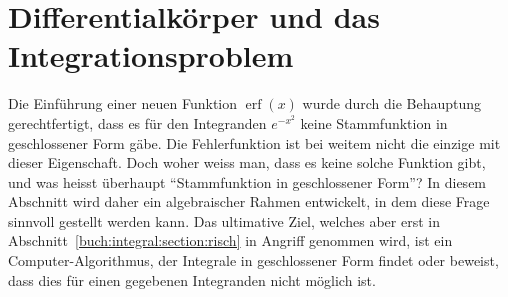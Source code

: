 %
%
%
\section{Differentialkörper und das Integrationsproblem
\label{buch:integrale:section:dkoerper}}
Die Einführung einer neuen Funktion $\operatorname{erf}(x)$ wurde
durch die Behauptung gerechtfertigt, dass es für den Integranden
$e^{-x^2}$ keine Stammfunktion in geschlossener Form gäbe.
Die Fehlerfunktion ist bei weitem nicht die einzige mit dieser
Eigenschaft.
Doch woher weiss man, dass es keine solche Funktion gibt, und
was heisst überhaupt ``Stammfunktion in geschlossener Form''?
In diesem Abschnitt wird daher ein algebraischer Rahmen entwickelt,
in dem diese Frage sinnvoll gestellt werden kann.
Das ultimative Ziel, welches aber erst in
Abschnitt~\ref{buch:integral:section:risch} in Angriff genommen
wird, ist ein Computer-Algorithmus, der Integrale in geschlossener
Form findet oder beweist, dass dies für einen gegebenen Integranden
nicht möglich ist.







